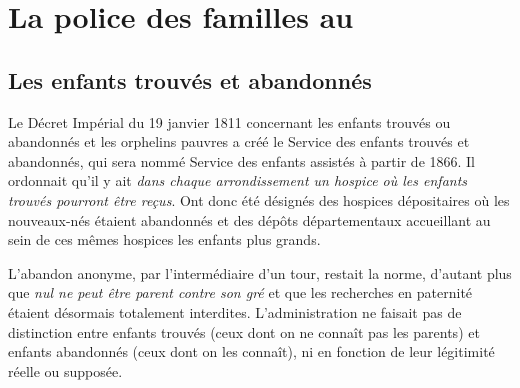 
\chapter{La police des familles au }


\section{Les enfants trouvés et abandonnés}

 Le Décret Impérial du 19 janvier 1811 concernant les enfants trouvés ou abandonnés et les orphelins pauvres a créé le Service des enfants trouvés et abandonnés, qui sera nommé Service des enfants assistés à partir de 1866. Il ordonnait qu'il y ait \emph{dans chaque arrondissement un hospice où les enfants trouvés pourront être reçus}. Ont donc été désignés des hospices dépositaires où les nouveaux-nés étaient abandonnés et des dépôts départementaux accueillant au sein de ces mêmes hospices les enfants plus grands. 

 L'abandon anonyme, par l'intermédiaire d'un tour, restait la norme, d'autant plus que \emph{nul ne peut être parent contre son gré} et que les recherches en paternité étaient désormais totalement interdites. L'administration ne faisait pas de distinction entre enfants trouvés (ceux dont on ne connaît pas les parents) et enfants abandonnés (ceux dont on les connaît), ni en fonction de leur légitimité réelle ou supposée.

